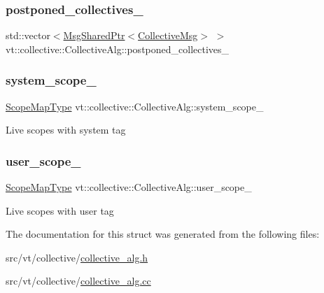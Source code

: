 \subsubsection{\texorpdfstring{postponed\+\_\+collectives\+\_\+}{postponed\_collectives\_}}
{\footnotesize\ttfamily std\+::vector$<$\hyperlink{namespacevt_ab2b3d506ec8e8d1540aede826d84a239}{Msg\+Shared\+Ptr}$<$\hyperlink{structvt_1_1collective_1_1_collective_alg_1_1_collective_msg}{Collective\+Msg}$>$ $>$ vt\+::collective\+::\+Collective\+Alg\+::postponed\+\_\+collectives\+\_\+\hspace{0.3cm}{\ttfamily [private]}}

\mbox{\label{structvt_1_1collective_1_1_collective_alg_a947ce4f129e1cf626da031595fe5df5c}} 
\subsubsection{\texorpdfstring{system\+\_\+scope\+\_\+}{system\_scope\_}}
{\footnotesize\ttfamily \hyperlink{structvt_1_1collective_1_1_collective_alg_abf644b20fe35cf654f5d4a6702ef5183}{Scope\+Map\+Type} vt\+::collective\+::\+Collective\+Alg\+::system\+\_\+scope\+\_\+\hspace{0.3cm}{\ttfamily [private]}}

Live scopes with system tag \mbox{\label{structvt_1_1collective_1_1_collective_alg_a72bb12e5bbe0c52e867c81e76db318d9}} 
\subsubsection{\texorpdfstring{user\+\_\+scope\+\_\+}{user\_scope\_}}
{\footnotesize\ttfamily \hyperlink{structvt_1_1collective_1_1_collective_alg_abf644b20fe35cf654f5d4a6702ef5183}{Scope\+Map\+Type} vt\+::collective\+::\+Collective\+Alg\+::user\+\_\+scope\+\_\+\hspace{0.3cm}{\ttfamily [private]}}

Live scopes with user tag 

The documentation for this struct was generated from the following files\+:\begin{DoxyCompactItemize}
\item 
src/vt/collective/\hyperlink{collective__alg_8h}{collective\+\_\+alg.\+h}\item 
src/vt/collective/\hyperlink{collective__alg_8cc}{collective\+\_\+alg.\+cc}\end{DoxyCompactItemize}
